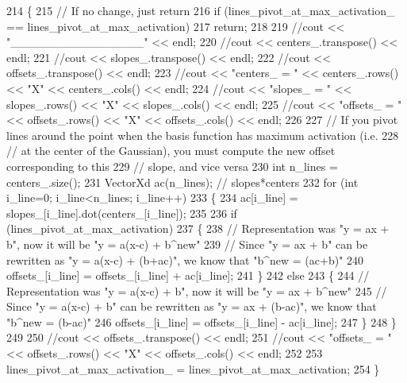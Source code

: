 \begin{DoxyCode}
214 \{
215   \textcolor{comment}{// If no change, just return}
216   \textcolor{keywordflow}{if} (lines\_pivot\_at\_max\_activation\_ == lines\_pivot\_at\_max\_activation)
217     \textcolor{keywordflow}{return};
218 
219   \textcolor{comment}{//cout << "\_\_\_\_\_\_\_\_\_\_\_\_\_\_\_\_" << endl;}
220   \textcolor{comment}{//cout << centers\_.transpose() << endl;  }
221   \textcolor{comment}{//cout << slopes\_.transpose() << endl;  }
222   \textcolor{comment}{//cout << offsets\_.transpose() << endl;  }
223   \textcolor{comment}{//cout << "centers\_ = " << centers\_.rows() << "X" << centers\_.cols() << endl;}
224   \textcolor{comment}{//cout << "slopes\_ = " << slopes\_.rows() << "X" << slopes\_.cols() << endl;}
225   \textcolor{comment}{//cout << "offsets\_ = " << offsets\_.rows() << "X" << offsets\_.cols() << endl;}
226 
227   \textcolor{comment}{// If you pivot lines around the point when the basis function has maximum activation (i.e.}
228   \textcolor{comment}{// at the center of the Gaussian), you must compute the new offset corresponding to this}
229   \textcolor{comment}{// slope, and vice versa    }
230   \textcolor{keywordtype}{int} n\_lines = centers\_.size();
231   VectorXd ac(n\_lines); \textcolor{comment}{// slopes*centers}
232   \textcolor{keywordflow}{for} (\textcolor{keywordtype}{int} i\_line=0; i\_line<n\_lines; i\_line++)
233   \{
234     ac[i\_line] = slopes\_[i\_line].dot(centers\_[i\_line]);
235     
236     \textcolor{keywordflow}{if} (lines\_pivot\_at\_max\_activation)
237     \{
238       \textcolor{comment}{// Representation was "y = ax + b", now it will be "y = a(x-c) + b^new" }
239       \textcolor{comment}{// Since "y = ax + b" can be rewritten as "y = a(x-c) + (b+ac)", we know that "b^new = (ac+b)"}
240       offsets\_[i\_line] = offsets\_[i\_line] + ac[i\_line];
241     \}
242     \textcolor{keywordflow}{else}
243     \{
244       \textcolor{comment}{// Representation was "y = a(x-c) + b", now it will be "y = ax + b^new" }
245       \textcolor{comment}{// Since "y = a(x-c) + b" can be rewritten as "y = ax + (b-ac)", we know that "b^new = (b-ac)"}
246       offsets\_[i\_line] = offsets\_[i\_line] - ac[i\_line];
247     \} 
248   \}
249   
250   \textcolor{comment}{//cout << offsets\_.transpose() << endl;  }
251   \textcolor{comment}{//cout << "offsets\_ = " << offsets\_.rows() << "X" << offsets\_.cols() << endl;}
252   
253   lines\_pivot\_at\_max\_activation\_ = lines\_pivot\_at\_max\_activation;
254 \}
\end{DoxyCode}
